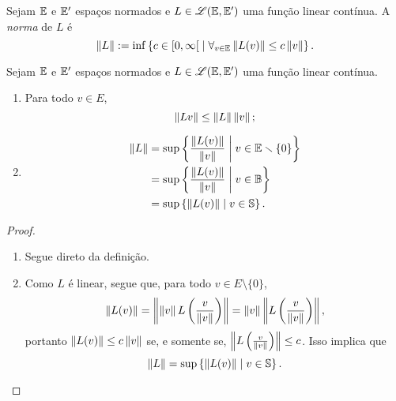 \begin{definition}
Sejam $\E$ e $\E'$ espaços normados e $L \in \toplin(\E, \E')$ uma função linear contínua. A \emph{norma} de $L$ é
	\begin{equation*}
	\nor{L} := \inf\set{c \in \intfa{0}{\infty}}{\forall_{v \in \E} \nor{L(v)} \leq c\nor{v}}.
	\end{equation*}
\end{definition}



\begin{proposition}
Sejam $\E$ e $\E'$ espaços normados e $L \in \toplin(\E, \E')$ uma função linear contínua.
	\begin{enumerate}
	\item Para todo $v \in E$,
		\begin{equation*}
		\nor{Lv} \leq \nor{L}\nor{v};
		\end{equation*}
		
	\item 
		\begin{align*}
		\nor{L} &= \sup \set{\frac{\nor{L(v)}}{\nor{v}}}{v \in \E \setminus \{0\}} \\
		& = \sup \set{\frac{\nor{L(v)}}{\nor{v}}}{v \in \B} \\
		&= \sup\set{\nor{L(v)}}{v \in \S}.
		\end{align*}
	\end{enumerate}
\end{proposition}
\begin{proof}
	\begin{enumerate}
	\item Segue direto da definição.

	\item Como $L$ é linear, segue que, para todo $v \in E\setminus\{0\}$,
	\begin{equation*}
	\nor{L(v)} = \nor{\nor{v}L\left(\frac{v}{\nor{v}}\right)} = \nor{v}\nor{L\left(\frac{v}{\nor{v}}\right)},
	\end{equation*}
portanto $\nor{L(v)} \leq c\nor{v}$ se, e somente se, $\nor{L\left(\frac{v}{\nor{v}}\right)} \leq c$. Isso implica que
	\begin{equation*}
	\nor{L} = \sup\set{\nor{L(v)}}{v \in \S}.
	\end{equation*}
	\end{enumerate}
\end{proof}




